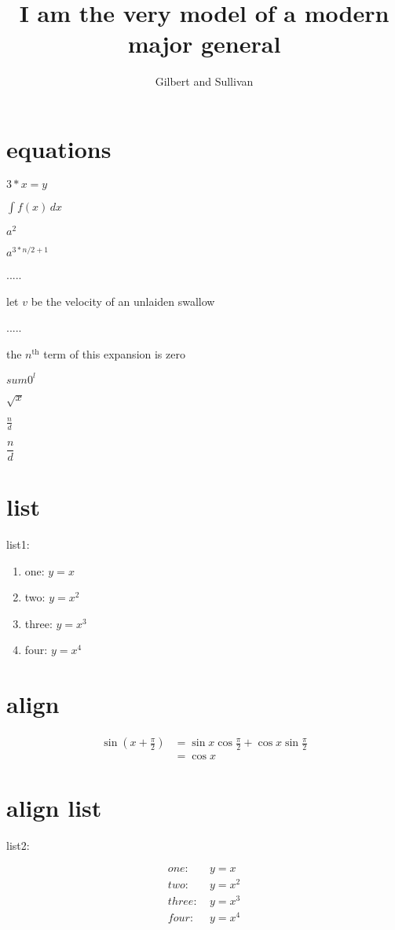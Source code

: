 \documentclass{article}
\title{I am the very model of a modern major general}
\author{Gilbert and Sullivan}
\date{}
\begin{document}
\maketitle


\section{equations}
$ 3*x=y$

$\int f(x)\, dx$

$a^2$

$a^{3*n/2+1}$

.....

let $v$ be the velocity of an unlaiden swallow

.....

the $n^\text{th}$ term of this expansion is zero

$sum{0^l}$

$\sqrt{x}$

$\frac{n}{d}$

$\dfrac{n}{d}$




\section{list}
list1:
\begin{enumerate}
\item one: $y=x$
\item two: $y=x^2$
\item three: $y=x^3$
\item four: $y=x^4$
\end{enumerate}

\section{align}
\begin{align}
\sin(x+\frac{\pi}{2})&=\sin x\cos\frac{\pi}{2}+\cos x\sin\frac{\pi}{2}\\&=\cos x
\end{align}





\section{align list}
list2:

\begin{align*}
one:  \  &  y=x \\two:  \   &  y=x^2 \\three:  \  &  y=x^3 \\four:  \  & y=x^4
\end{align*}
\end{document}
